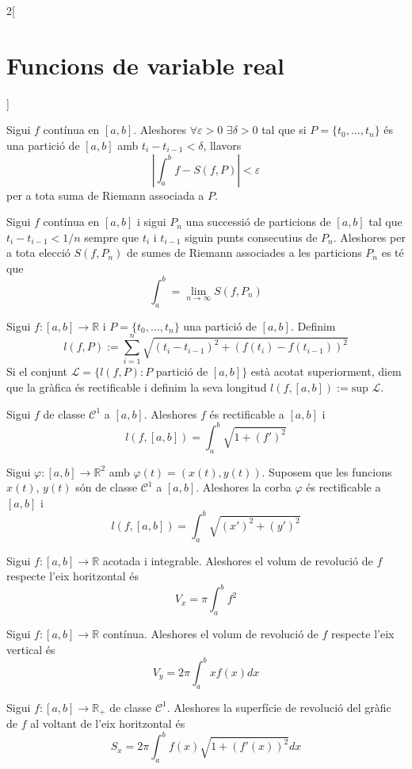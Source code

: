 \documentclass[class=article,10pt,crop=false]{standalone}
\begin{document}
\begin{multicols}{2}[\section{Funcions de variable real}]
\begin{theorem}
Sigui $f$ contínua en $[a,b]$. Aleshores $\forall\varepsilon>0$ $\exists\delta>0$ tal que si $P=\{t_0,\ldots,t_n\}$ és una partició de $[a,b]$ amb $t_i-t_{i-1}<\delta$, llavors $$\left|\int_a^bf-S(f,P)\right|<\varepsilon$$ per a tota suma de Riemann associada a $P$.
\end{theorem}
\begin{corollary}
Sigui $f$ contínua en $[a,b]$ i sigui $P_n$ una successió de particions de $[a,b]$ tal que $t_i-t_{i-1}<1/n$ sempre que $t_i$ i $t_{i-1}$ siguin punts consecutius de $P_n$. Aleshores per a tota elecció $S(f,P_n)$ de sumes de Riemann associades a les particions $P_n$ es té que $$\int_a^b=\lim_{n\to\infty}S(f,P_n)$$
\end{corollary}
\begin{definition}
Sigui $f:[a,b]\rightarrow\mathbb{R}$ i $P=\{t_0,\ldots,t_n\}$ una partició de $[a,b]$. Definim $$l(f,P):=\sum_{i=1}^n\sqrt{(t_i-t_{i-1})^2+(f(t_i)-f(t_{i-1}))^2}$$Si el conjunt $\mathcal{L}=\{l(f,P):P \text{ partició de }[a,b]\}$ està acotat superiorment, diem que la gràfica és rectificable i definim la seva longitud $l(f,[a,b]):=\text{sup }\mathcal{L}$.
\end{definition}
\begin{prop}
Sigui $f$ de classe $\mathcal{C}^1$ a $[a,b]$. Aleshores $f$ és rectificable a $[a,b]$ i $$l(f,[a,b])=\int_a^b\sqrt{1+(f')^2}$$
\end{prop}
\begin{prop}
Sigui $\varphi:[a,b]\rightarrow\mathbb{R}^2$ amb $\varphi(t)=(x(t),y(t))$. Suposem que les funcions $x(t)$, $y(t)$ són de classe $\mathcal{C}^1$ a $[a,b]$. Aleshores la corba $\varphi$ és rectificable a $[a,b]$ i $$l(f,[a,b])=\int_a^b\sqrt{(x')^2+(y')^2}$$
\end{prop}
\begin{prop}
Sigui $f:[a,b]\rightarrow\mathbb{R}$ acotada i integrable. Aleshores el volum de revolució de $f$ respecte l'eix horitzontal és $$V_x=\pi\int_a^bf^2$$
\end{prop}
\begin{prop}
Sigui $f:[a,b]\rightarrow\mathbb{R}$ contínua. Aleshores el volum de revolució de $f$ respecte l'eix vertical és $$V_y=2\pi\int_a^bxf(x)dx$$
\end{prop}
\begin{prop}
Sigui $f:[a,b]\rightarrow\mathbb{R_+}$ de classe $\mathcal{C}^1$. Aleshores la superfície de revolució del gràfic de $f$ al voltant de l'eix horitzontal és $$S_x=2\pi\int_a^bf(x)\sqrt{1+(f'(x))^2}dx$$

\end{prop}
\end{multicols}
\end{document}
